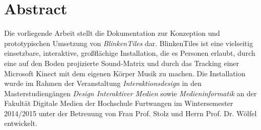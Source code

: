 \section*{Abstract}
Die vorliegende Arbeit stellt die Dokumentation zur Konzeption und prototypischen Umsetzung von \emph{BlinkenTiles} dar. BlinkenTiles ist eine vielseitig einsetzbare, interaktive, großflächige Installation, die es Personen erlaubt, durch eine auf den Boden projizierte Sound-Matrix und durch das Tracking einer Microsoft Kinect mit dem eigenen Körper Musik zu machen. Die Installation wurde im Rahmen der Veranstaltung \textit{Interaktionsdesign} in den Masterstudiengängen \textit{Design Interaktiver Medien} sowie \textit{Medieninformatik} an der Fakultät Digitale Medien der Hochschule Furtwangen im Wintersemester 2014/2015 unter der Betreuung von Frau Prof. Stolz und Herrn Prof. Dr. Wölfel entwickelt.